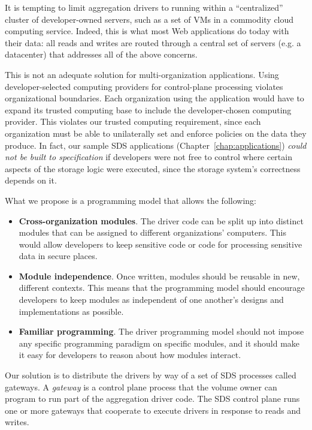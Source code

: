 It is tempting to limit aggregation drivers to
running within a ``centralized'' cluster of developer-owned servers,
such as a set of VMs in a commodity cloud computing service.  Indeed, this is
what most Web applications do today with their data:  all reads and writes are routed through a
central set of servers (e.g. a datacenter) that addresses all of the above
concerns.

This is not an adequate solution for multi-organization applications.
Using developer-selected computing providers for control-plane processing
violates organizational boundaries.  Each organization using the application
would have to expand its trusted computing base to include the developer-chosen
computing provider.  This violates our trusted computing requirement, since each
organization must be able to unilaterally set and enforce policies on the data
they produce.  In fact, our sample SDS applications
(Chapter~\ref{chap:applications}) \emph{could not be built to specification} if
developers were not free to control where certain aspects of the storage logic
were executed, since the storage system's correctness depends on it.


What we propose is a programming model that allows the following:

\begin{itemize}
   \item \textbf{Cross-organization modules}.  The driver code
      can be split up into distinct modules that can be
      assigned to different organizations' computers.  This would allow
      developers to keep sensitive code or code for processing sensitive data
      in secure places.
   \item \textbf{Module independence}.  Once written, modules should be reusable in 
      new, different contexts.  This means that the programming model should
      encourage developers to keep modules as independent of one another's
      designs and implementations as possible.
   \item \textbf{Familiar programming}.  The driver programming model
      should not impose any specific programming paradigm on specific modules,
      and it should make it easy for developers to reason about how modules
      interact.
\end{itemize}

Our solution is to distribute the drivers by way of a set of SDS processes called gateways.
A \emph{gateway} is a control plane process that the
volume owner can program to run part of the aggregation driver code.  The SDS control plane
runs one or more gateways that cooperate to execute drivers in response
to reads and writes.

